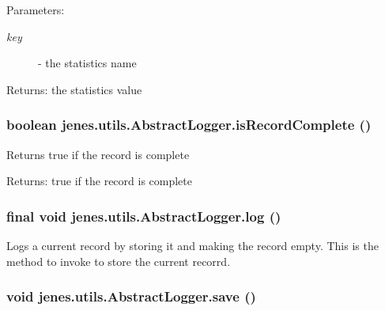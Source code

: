 \begin{Desc}
\item[Parameters:]
\begin{description}
\item[{\em key}]- the statistics name \end{description}
\end{Desc}
\begin{Desc}
\item[Returns:]the statistics value \end{Desc}
\hypertarget{classjenes_1_1utils_1_1_abstract_logger_f4f01e740a9332b8bb32817e01e7b030}{
\subsubsection[isRecordComplete]{\setlength{\rightskip}{0pt plus 5cm}boolean jenes.utils.AbstractLogger.isRecordComplete ()}}
\label{classjenes_1_1utils_1_1_abstract_logger_f4f01e740a9332b8bb32817e01e7b030}


Returns true if the record is complete

\begin{Desc}
\item[Returns:]true if the record is complete \end{Desc}
\hypertarget{classjenes_1_1utils_1_1_abstract_logger_26e56f4617fbd249359186c90ec265ba}{
\subsubsection[log]{\setlength{\rightskip}{0pt plus 5cm}final void jenes.utils.AbstractLogger.log ()}}
\label{classjenes_1_1utils_1_1_abstract_logger_26e56f4617fbd249359186c90ec265ba}


Logs a current record by storing it and making the record empty. This is the method to invoke to store the current recorrd. \hypertarget{classjenes_1_1utils_1_1_abstract_logger_736fbff3759196a70dbf6618f10e8786}{
\subsubsection[save]{\setlength{\rightskip}{0pt plus 5cm}void jenes.utils.AbstractLogger.save ()}}
\label{classjenes_1_1utils_1_1_abstract_logger_736fbff3759196a70dbf6618f10e8786}


